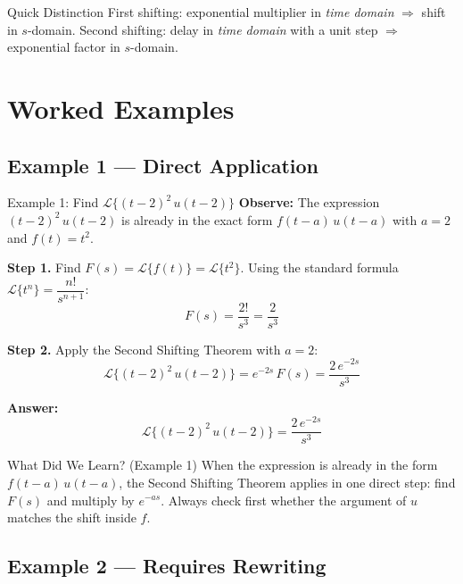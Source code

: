 \documentclass[12pt,a4paper]{article}
\begin{document}
\begin{learnbox}{Quick Distinction}
First shifting: exponential multiplier in \emph{time domain} $\Rightarrow$ shift in $s$-domain.
Second shifting: delay in \emph{time domain} with a unit step $\Rightarrow$ exponential factor in $s$-domain.
\end{learnbox}

\section{Worked Examples}

\subsection*{Example 1 --- Direct Application}

\begin{infobox}{Example 1: Find $\mathcal{L}\{(t-2)^2\,u(t-2)\}$}
\textbf{Observe:} The expression $(t-2)^2\,u(t-2)$ is already in the exact form
$f(t-a)\,u(t-a)$ with $a = 2$ and $f(t) = t^2$.

\textbf{Step 1.} Find $F(s) = \mathcal{L}\{f(t)\} = \mathcal{L}\{t^2\}$.
Using the standard formula $\mathcal{L}\{t^n\} = \dfrac{n!}{s^{n+1}}$:
\[
  F(s) = \frac{2!}{s^3} = \frac{2}{s^3}
\]

\textbf{Step 2.} Apply the Second Shifting Theorem with $a = 2$:
\[
  \mathcal{L}\{(t-2)^2\,u(t-2)\} = e^{-2s}\,F(s) = \frac{2\,e^{-2s}}{s^3}
\]

\textbf{Answer:}
\[
  \boxed{\mathcal{L}\{(t-2)^2\,u(t-2)\} = \frac{2\,e^{-2s}}{s^3}}
\]
\end{infobox}

\begin{learnbox}{What Did We Learn? (Example 1)}
When the expression is already in the form $f(t-a)\,u(t-a)$, the Second Shifting Theorem
applies in one direct step: find $F(s)$ and multiply by $e^{-as}$.
Always check first whether the argument of $u$ matches the shift inside $f$.
\end{learnbox}

\subsection*{Example 2 --- Requires Rewriting}
\end{document}
